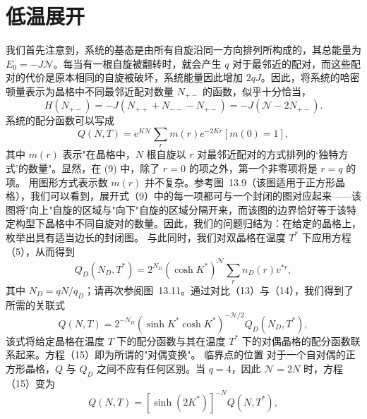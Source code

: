 \section{低温展开}\label{ux4f4eux6e29ux5c55ux5f00}
我们首先注意到，系统的基态是由所有自旋沿同一方向排列所构成的，其总能量为 \(E_{0} = -J\mathcal{N}\)。每当有一根自旋被翻转时，就会产生 \(q\) 对于最邻近的配对，而这些配对的代价是原本相同的自旋被破坏，系统能量因此增加 \(2qJ\)。因此，将系统的哈密顿量表示为晶格中不同最邻近配对数量 \(N_{+-}\) 的函数，似乎十分恰当，
\begin{equation}\tag{13.1.89}\label{eq:13.1.89}
H ( N _ { + - } ) = - J ( N _ { + + } + N _ { -- } - N _ { + - } ) = - J ( \mathcal { N } - 2 N _ { + - } ) .
\end{equation}
系统的配分函数可以写成
\begin{equation}\tag{13.1.90}\label{eq:13.1.90}
Q ( N , T ) = e ^{K \mathcal { N} } \sum _ { r } m ( r ) e ^{- 2 K r}  [ m ( 0 ) = 1 ] ,
\end{equation}
其中 \(m(r)\) 表示"在晶格中，\(N\) 根自旋以 \(r\) 对最邻近配对的方式排列的`独特方式'的数量"。显然，在 (9) 中，除了 \(r=0\) 的项之外，第一个非零项将是 \(r=q\) 的项。
用图形方式表示数 \(m(r)\) 并不复杂。参考图~13.9（该图适用于正方形晶格），我们可以看到，展开式（9）中的每一项都可与一个封闭的图对应起来——该图将"向上"自旋的区域与"向下"自旋的区域分隔开来，而该图的边界恰好等于该特定构型下晶格中不同自旋对的数量。因此，我们的问题归结为：在给定的晶格上，枚举出具有适当边长的封闭图。
与此同时，我们对双晶格在温度 \(T^{*}\) 下应用方程（5），从而得到
\begin{equation}\tag{13.1.91}\label{eq:13.1.91}
Q _ { D } ( N _ { D } , T ^{*} ) = 2 ^{N _ { D} } ( \cosh K ^{*} ) ^{\mathcal { N} } \sum _ { r } n _ { D } ( r ) v ^{* r} ,
\end{equation}
其中 \(N_{D}=qN/q_{D}\)；请再次参阅图~13.11。通过对比（13）与（14），我们得到了所需的关联式
\begin{equation}\tag{13.1.92}\label{eq:13.1.92}
Q ( N , T ) = 2 ^{- N _ { D} } ( \sinh K ^{*} \cosh K ^{*} ) ^{- \mathcal { N} / 2 } Q _ { D } ( N _ { D } , T ^{*} ) ,
\end{equation}
该式将给定晶格在温度 \(T\) 下的配分函数与其在温度 \(T^{*}\) 下的对偶晶格的配分函数联系起来。方程（15）即为所谓的"对偶变换"。
临界点的位置
对于一个自对偶的正方形晶格，\(Q\) 与 \(Q_D\) 之间不应有任何区别。当 \(q=4\)，因此 \(\mathcal{N}=2N\) 时，方程（15）变为
\begin{equation}\tag{13.1.93}\label{eq:13.1.93}
Q ( N , T ) = [ \sinh ( 2 K ^{*} ) ] ^{- N} Q ( N , T ^{*} ) ,
\end{equation}
